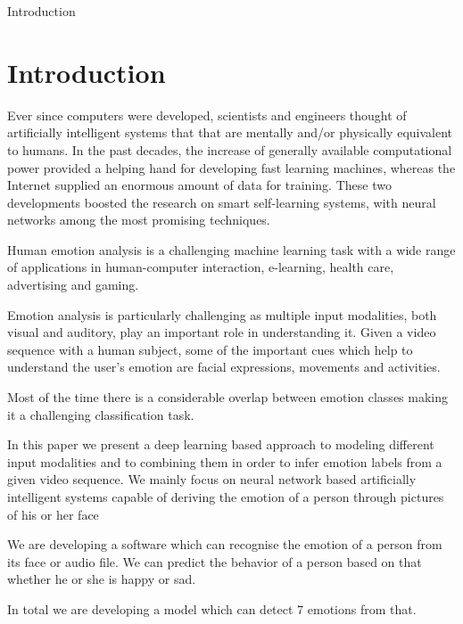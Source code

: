 \begin{center}
	{\Huge Introduction}
\end{center}

\section{Introduction}
Ever since computers were developed, scientists and engineers thought of artificially intelligent systems that that are mentally and/or physically equivalent to humans. In the past decades, the increase of generally available computational power provided a helping hand for developing fast learning machines, whereas the Internet supplied an enormous amount of data for training. These two developments boosted the research on smart self-learning systems, with neural networks among the most promising techniques.\newline

Human emotion analysis is a challenging machine learning task with a wide range of applications in human-computer interaction, e-learning, health care, advertising and gaming.\newline

Emotion analysis is particularly challenging as multiple input modalities, both visual and auditory, play an important role in understanding it. Given a video sequence with a human subject, some of the important cues which help to understand the user’s emotion are facial expressions, movements and activities.\newline

Most of the time there is a considerable overlap between emotion classes making it a challenging classification task.\newline

In this paper we present a deep learning based approach to modeling different input modalities and to combining them in order to infer emotion labels from a given video sequence. We mainly focus on neural network based artificially intelligent systems capable of deriving the emotion of a person through pictures of his or her face\newline

We are developing a software which can recognise the emotion of  a person from its face or audio file. We can predict the behavior of a person based on that whether he or she is happy or sad. \newline 

In total we are developing a model which can detect 7 emotions from that.